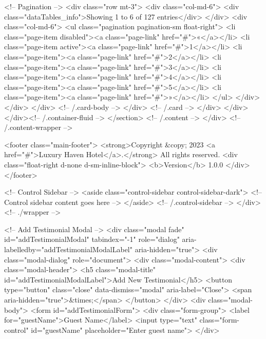                                 <!-- Pagination -->
                                <div class="row mt-3">
                                    <div class="col-md-6">
                                        <div class="dataTables_info">Showing 1 to 6 of 127 entries</div>
                                    </div>
                                    <div class="col-md-6">
                                        <ul class="pagination pagination-sm float-right">
                                            <li class="page-item disabled"><a class="page-link" href="#">«</a></li>
                                            <li class="page-item active"><a class="page-link" href="#">1</a></li>
                                            <li class="page-item"><a class="page-link" href="#">2</a></li>
                                            <li class="page-item"><a class="page-link" href="#">3</a></li>
                                            <li class="page-item"><a class="page-link" href="#">4</a></li>
                                            <li class="page-item"><a class="page-link" href="#">5</a></li>
                                            <li class="page-item"><a class="page-link" href="#">»</a></li>
                                        </ul>
                                    </div>
                                </div>
                            </div>
                            <!-- /.card-body -->
                        </div>
                        <!-- /.card -->
                    </div>
                </div>
            </div><!-- /.container-fluid -->
        </section>
        <!-- /.content -->
    </div>
    <!-- /.content-wrapper -->

    <footer class="main-footer">
        <strong>Copyright &copy; 2023 <a href="#">Luxury Haven Hotel</a>.</strong>
        All rights reserved.
        <div class="float-right d-none d-sm-inline-block">
            <b>Version</b> 1.0.0
        </div>
    </footer>

    <!-- Control Sidebar -->
    <aside class="control-sidebar control-sidebar-dark">
        <!-- Control sidebar content goes here -->
    </aside>
    <!-- /.control-sidebar -->
</div>
<!-- ./wrapper -->

<!-- Add Testimonial Modal -->
<div class="modal fade" id="addTestimonialModal" tabindex="-1" role="dialog" aria-labelledby="addTestimonialModalLabel" aria-hidden="true">
    <div class="modal-dialog" role="document">
        <div class="modal-content">
            <div class="modal-header">
                <h5 class="modal-title" id="addTestimonialModalLabel">Add New Testimonial</h5>
                <button type="button" class="close" data-dismiss="modal" aria-label="Close">
                    <span aria-hidden="true">&times;</span>
                </button>
            </div>
            <div class="modal-body">
                <form id="addTestimonialForm">
                    <div class="form-group">
                        <label for="guestName">Guest Name</label>
                        <input type="text" class="form-control" id="guestName" placeholder="Enter guest name">
                    </div>
                    
